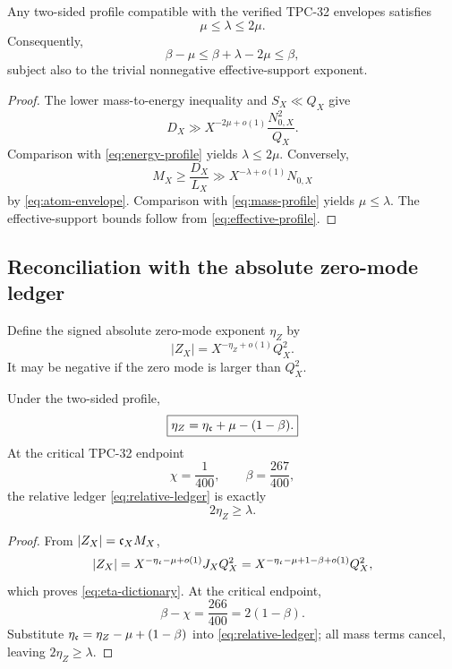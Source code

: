 \begin{proposition}
\label{prop:feasible-wedge}
Any two-sided profile compatible with the verified TPC-32 envelopes
satisfies
\begin{equation}
 \boxed{\mu\le\lambda\le2\mu.}
\label{eq:feasible-wedge}
\end{equation}
Consequently,
\[
 \beta-\mu
 \le
 \beta+\lambda-2\mu
 \le
 \beta,
\]
subject also to the trivial nonnegative effective-support exponent.
\end{proposition}

\begin{proof}
The lower mass-to-energy inequality and \(S_X\ll Q_X\) give
\[
 D_X\gg X^{-2\mu+o(1)}
 \frac{N_{0,X}^2}{Q_X}.
\]
Comparison with \eqref{eq:energy-profile} yields
\(\lambda\le2\mu\).  Conversely,
\[
 M_X\ge\frac{D_X}{L_X}
 \gg X^{-\lambda+o(1)}N_{0,X}
\]
by \eqref{eq:atom-envelope}.  Comparison with
\eqref{eq:mass-profile} yields \(\mu\le\lambda\).
The effective-support bounds follow from
\eqref{eq:effective-profile}.
\end{proof}

\subsection{Reconciliation with the absolute zero-mode ledger}

Define the signed absolute zero-mode exponent \(\eta_Z\) by
\begin{equation}
 |Z_X|=X^{-\eta_Z+o(1)}Q_X^2.
\label{eq:absolute-Z-profile}
\end{equation}
It may be negative if the zero mode is larger than \(Q_X^2\).

\begin{proposition}
\label{prop:relative-absolute-dictionary}
Under the two-sided profile,
\begin{equation}
 \boxed{
 \eta_Z
 =
 \eta_{\mathfrak c}+\mu-(1-\beta).}
\label{eq:eta-dictionary}
\end{equation}
At the critical TPC-32 endpoint
\[
 \chi=\frac1{400},
 \qquad
 \beta=\frac{267}{400},
\]
the relative ledger \eqref{eq:relative-ledger} is exactly
\begin{equation}
 \boxed{2\eta_Z\ge\lambda.}
\label{eq:absolute-ledger}
\end{equation}
\end{proposition}

\begin{proof}
From \(|Z_X|=\mathfrak c_XM_X\),
\[
 |Z_X|
 =
 X^{-\eta_{\mathfrak c}-\mu+o(1)}
 J_XQ_X^2
 =
 X^{-\eta_{\mathfrak c}-\mu+1-\beta+o(1)}Q_X^2,
\]
which proves \eqref{eq:eta-dictionary}.  At the critical endpoint,
\[
 \beta-\chi
 =
 \frac{266}{400}
 =
 2(1-\beta).
\]
Substitute
\(\eta_{\mathfrak c}=\eta_Z-\mu+(1-\beta)\) into
\eqref{eq:relative-ledger}; all mass terms cancel, leaving
\(2\eta_Z\ge\lambda\).
\end{proof}

